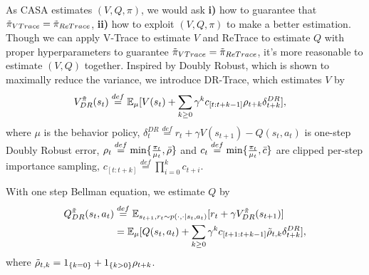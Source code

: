 As CASA estimates $(V, Q, \pi)$, we would ask
\textbf{i)} how to guarantee that $\Tilde{\pi}_{VTrace} = \Tilde{\pi}_{ReTrace}$, 
\textbf{ii)} how to exploit $(V, Q, \pi)$ to make a better estimation. 
Though we can apply V-Trace to estimate $V$ and ReTrace to estimate $Q$ with proper hyperparameters to guarantee $\Tilde{\pi}_{VTrace} = \Tilde{\pi}_{ReTrace}$, it's more reasonable to estimate $(V, Q)$ together. 
Inspired by Doubly Robust, which is shown to maximally reduce the variance, we introduce DR-Trace, which estimates $V$ by 
$$
\label{eq:dr-v}
    \begin{aligned}
        V_{DR}^{\Tilde{\pi}} (s_t) &\overset{def}{=} \mathbb{E}_{\mu} [ 
        V(s_t) + \sum_{k \geq 0} \gamma^k 
     c_{[t:t+k-1]} \rho_{t+k}  \delta^{DR}_{t+k} ],  
    \end{aligned}
$$
{ where $\mu$ is the behavior policy}, $\delta^{DR}_t \overset{def}{=} r_t + \gamma V(s_{t+1}) - Q(s_t, a_t)$ is one-step Doubly Robust error, $\rho_t \overset{def}{=} \min\{\frac{\pi_t}{\mu_t}, \Bar{\rho} \}$ and $c_t \overset{def}{=} \min\{\frac{\pi_t}{\mu_t}, \Bar{c}\}$ are clipped per-step importance sampling, $c_{[t: t+k]} \overset{def}{=} \prod_{i=0}^{k} c_{t+i}$.

With one step Bellman equation, we estimate $Q$ by
$$
\label{eq:dr-q}
    \begin{aligned}
         Q_{DR}^{\Tilde{\pi}} (s_t, a_t) 
         &\overset{def}{=} \mathbb{E}_{s_{t+1}, r_t \sim p(\cdot, \cdot | s_t, a_t)} [  r_t + \gamma   V_{DR}^{\Tilde{\pi}} (s_{t+1}) ] 
        \\
        &=  \mathbb{E}_{\mu}   [
        Q(s_t, a_t) + \sum_{k \geq 0}  \gamma^k
        c_{[t+1:t+k-1]} \Tilde{\rho}_{t, k}
        \delta^{DR}_{t+k}
        ], 
    \end{aligned}
$$
where $\Tilde{\rho}_{t, k} =  1_{\{k=0\}} + 1_{\{k > 0\}} \rho_{t+k}$.

